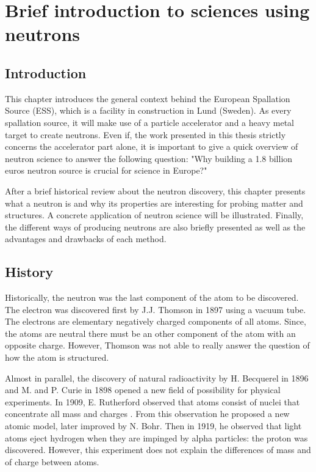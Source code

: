 \chapter{Brief introduction to sciences using neutrons}
\cleardoublepage

\minitoc

\section{Introduction}
\begin{refsection}
  \label{ch1:Introduction}
  This chapter introduces the general context behind the European Spallation Source (ESS), which is a facility in construction in Lund (Sweden). As every spallation source, it will make use of a particle accelerator and a heavy metal target to create neutrons. Even if, the work presented in this thesis strictly concerns the accelerator part alone, it is important to give a quick overview of neutron science to answer the following question: "Why building a 1.8 \texteuro billion euros neutron source is crucial for science in Europe?"

  After a brief historical review about the neutron discovery, this chapter presents what a neutron is and why its properties are interesting for probing matter and structures. A concrete application of neutron science will be illustrated. Finally, the different ways of producing neutrons are also briefly presented as well as the advantages and drawbacks of each method.

  \section{History}
  Historically, the neutron was the last component of the atom to be discovered. The electron was discovered first by J.J. Thomson in 1897 using a vacuum tube. The electrons are elementary negatively charged components of all atoms. Since, the atoms are neutral there must be an other component of the atom with an opposite charge. However, Thomson was not able to really answer the question of how the atom is structured.

  Almost in parallel, the discovery of natural radioactivity by H. Becquerel in 1896 and M. and P. Curie in 1898 opened a new field of possibility for physical experiments. In 1909, E. Rutherford observed that atoms consist of nuclei that concentrate all mass and charges \cite{Rutherford:1911zz}.
  From this observation he proposed a new atomic model, later improved by N. Bohr. Then in 1919, he observed that light atoms eject hydrogen when they are impinged by alpha particles: the proton was discovered. However, this experiment does not explain the differences of mass and of charge between atoms.


\end{refsection}

